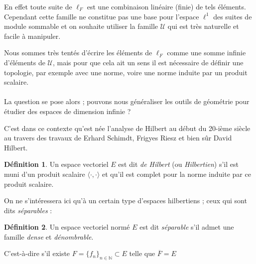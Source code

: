 \documentclass[]{article}
\theoremstyle{remark}
\theoremstyle{definition}
\newtheorem{mydef}{Définition}
\begin{document}
	En effet toute suite de $\ell_F$ est une combinaison linéaire (finie) de tels éléments. Cependant cette famille ne constitue pas une base pour l'espace $\ell^1$ des suites de module sommable et on souhaite utiliser la famille $\mathcal{U}$ qui est très naturelle et facile à manipuler.
	
	Nous sommes très tentés d'écrire les éléments de $\ell_F$ comme une somme infinie d'éléments de $\mathcal{U}$, mais pour que cela ait un sens il est nécessaire de définir une topologie, par exemple avec une norme, voire une norme induite par un produit scalaire.
	
	\paragraph*{}
	
	La question se pose alors ; pouvons nous généraliser les outils de géométrie pour étudier des espaces de dimension infinie ?
	
	C'est dans ce contexte qu'est née l'analyse de Hilbert au début du 20-ième siècle au travers des travaux de Erhard Schimdt, Frigyes Riesz et bien sûr David Hilbert.
	
	\begin{mydef}
		Un espace vectoriel $E$ est dit \textit{de Hilbert} (ou \textit{Hilbertien}) s'il est muni d'un produit scalaire $\langle \cdot, \cdot \rangle$ et qu'il est complet pour la norme induite par ce produit scalaire.
	\end{mydef}
	
	On ne s'intéressera ici qu'à un certain type d'espaces hilbertiens ; ceux qui sont dits \textit{séparables} :
	
	\begin{mydef}
		Un espace vectoriel normé $E$ est dit \textit{séparable} s'il admet une famille \textit{dense} et \textit{dénombrable}.
		
		C'est-à-dire s'il existe $F = \{f_n\}_{n \in \mathbb{N}} \subset E$ telle que $\overline{F} = E$
	\end{mydef}
	
\end{document}

